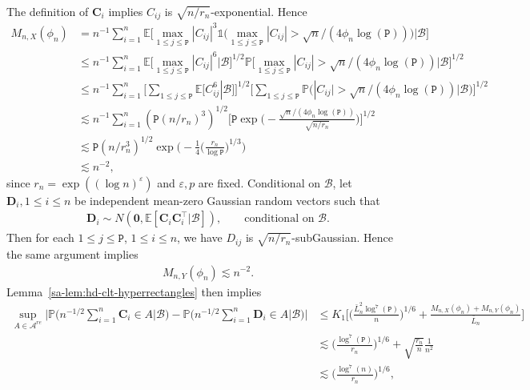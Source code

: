 \documentclass[10pt]{article}
\def\bC{\mathbf{C}}
\def\bD{\mathbf{D}}
\def\bD{\boldsymbol{D}}
\def\E{\mathbb{E}}
\def\P{\mathbb{P}}
\def\ttp{\mathtt{P}}
\newcommand{\Indicator}{\mathds{1}}
\theoremstyle{definition}
\theoremstyle{remark}
\begin{document}
The definition of $\bC_i$ implies $C_{ij}$ is $\sqrt{n/r_n}$-exponential. Hence
\begin{align*}
    M_{n,X}(\phi_n) & = n^{-1} \sum_{i = 1}^n \E \bigg[\max_{1 \leq j \leq \ttp} |C_{ij}|^3 \Indicator\Big(\max_{1 \leq j \leq \ttp} |C_{ij}| > \sqrt{n}/(4 \phi_n \log(\ttp))\Big) \bigg| \mathscr{B}\bigg] \\
    & \leq n^{-1} \sum_{i = 1}^n \E \bigg[\max_{1 \leq j \leq \ttp} |C_{ij}|^6 \bigg| \mathscr{B} \bigg]^{1/2} \P \bigg[\max_{1 \leq j \leq \ttp} |C_{ij}| > \sqrt{n}/(4 \phi_n \log(\ttp))\bigg| \mathscr{B} \bigg]^{1/2} \\
    & \leq n^{-1} \sum_{i = 1}^n \bigg[\sum_{1 \leq j \leq \ttp} \E[C_{ij}^6| \mathscr{B}]  \bigg]^{1/2} \bigg[\sum_{1 \leq j \leq \ttp} \P \Big(|C_{ij}| > \sqrt{n}/(4 \phi_n \log(\ttp))\Big| \mathscr{B}\Big)\bigg]^{1/2} \\
    & \lesssim n^{-1} \sum_{i = 1}^n (\ttp (n/r_n)^3)^{1/2} \bigg[\ttp \exp \Big( -\frac{\sqrt{n}/(4 \phi_n \log(\ttp))}{\sqrt{n/r_n}}\Big) \bigg]^{1/2} \\
    & \lesssim \ttp (n/r_n^3)^{1/2} \exp \Big(- \frac{1}{4}\Big(\frac{r_n}{\log \ttp}\Big)^{1/3} \Big) \\
    & \lesssim n^{-2},
\end{align*}
since $r_n = \exp((\log n)^{\varepsilon})$ and $\varepsilon, p$ are fixed. Conditional on $\mathscr{B}$, let $\bD_i, 1 \leq i \leq n$ be independent mean-zero Gaussian random vectors such that
\begin{align*}
    \bD_i \sim N(\mathbf{0}, \E[\bC_i \bC_i^{\top}|\mathscr{B}]), \qquad \text{conditional on } \mathscr{B}.
\end{align*}
Then for each $1 \leq j \leq \ttp$, $1 \leq i \leq n$, we have $D_{ij}$ is $\sqrt{n/r_n}$-subGaussian. Hence the same argument implies
\begin{align*}
    M_{n,Y}(\phi_n) \lesssim n^{-2}.
\end{align*}
Lemma~\ref{sa-lem:hd-clt-hyperrectangles} then implies
\begin{align}\label{eq: clt retangles}
    \nonumber \sup_{A \in \mathcal{A}^{re}} \bigg|\P \Big(n^{-1/2}\sum_{i= 1}^n \bC_i \in A \Big| \mathscr{B} \Big) - \P \Big(n^{-1/2}\sum_{i=1}^n \bD_i \in A \Big| \mathscr{B} \Big)\bigg|
    & \leq K_1 \bigg[\Big(\frac{\bar{L}_n^2 \log^7(\ttp)}{n}\Big)^{1/6} 
    + \frac{M_{n,X}(\phi_n) + M_{n,Y}(\phi_n)}{\bar{L}_n}\bigg] \\
    \nonumber & \lesssim \bigg(\frac{\log^7(\ttp)}{r_n}\bigg)^{1/6} + \sqrt{\frac{r_n}{n}} \frac{1}{n^2} \\
    & \lesssim \bigg(\frac{\log^7(n)}{r_n}\bigg)^{1/6},
\end{align}
\end{document}
